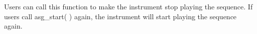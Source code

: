Users can call this function to make the instrument stop playing the sequence. If users call asg\_start( ) again,  the instrument will start playing the sequence again.



